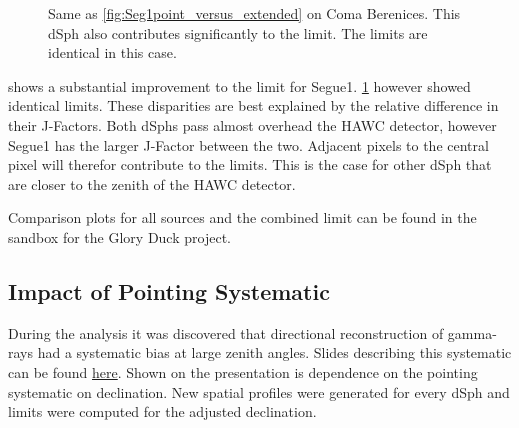 \begin{figure}[h]
    \caption{Same as \cref{fig:Seg1point_versus_extended} on Coma Berenices. This dSph also contributes significantly to the limit. The limits are identical in this case.}
\label{fig:ComaBpoint_versus_extended}
\end{figure}

 shows a substantial improvement to the limit for Segue1.
\cref{fig:ComaBpoint_versus_extended} however showed identical limits.
These disparities are best explained by the relative difference in their J-Factors.
Both dSphs pass almost overhead the HAWC detector, however Segue1 has the larger J-Factor between the two.
Adjacent pixels to the central pixel will therefor contribute to the limits.
This is the case for other dSph that are closer to the zenith of the HAWC detector.

Comparison plots for all sources and the combined limit can be found in the sandbox for the Glory Duck project.

\subsection{Impact of Pointing Systematic}\label{sec:gd_pointing_sys}

During the analysis it was discovered that directional reconstruction of gamma-rays had a systematic bias at large zenith angles.
Slides describing this systematic can be found \href{https://private.hawc-observatory.org/wiki/images/3/30/HAWCMeetingOct2020-AJS-Pointing.pdf}{here}.
Shown on the presentation is dependence on the pointing systematic on declination.
New spatial profiles were generated for every dSph and limits were computed for the adjusted declination.

